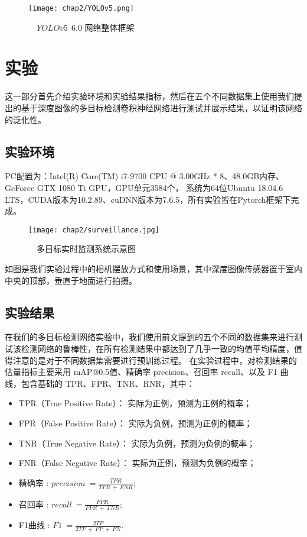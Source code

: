 \vspace{6mm}
\begin{figure}[h]
	\centering
	\texttt{[image: chap2/YOLOv5.png]}
	\caption{\ \ $YOLOv5\ \ 6.0$ 网络整体框架}
	\label{fig2-5}
\end{figure}
\vspace{3mm}

\section{实验}
\label{sec2-4}
这一部分首先介绍实验环境和实验结果指标，然后在五个不同数据集上使用我们提出的基于深度图像的多目标检测卷积神经网络进行测试并展示结果，以证明该网络的泛化性。

\subsection{实验环境}
PC配置为：Intel(R) Core(TM) i7-9700 CPU @ 3.00GHz * 8、48.0GB内存、GeForce GTX 1080 Ti GPU，GPU单元3584个，
系统为64位Ubuntu 18.04.6 LTS，CUDA版本为10.2.89、cuDNN版本为7.6.5，所有实验皆在Pytorch框架下完成。

\vspace{6mm}
\begin{figure}[h]
	\centering
	\texttt{[image: chap2/surveillance.jpg]}
	\caption{\ \ 多目标实时监测系统示意图}
	\label{fig2-6}
\end{figure}
\vspace{3mm}
如图是我们实验过程中的相机摆放方式和使用场景，其中深度图像传感器置于室内中央的顶部，垂直于地面进行拍摄。

\subsection{实验结果}
在我们的多目标检测网络实验中，我们使用前文提到的五个不同的数据集来进行测试该检测网络的鲁棒性，在所有检测结果中都达到了几乎一致的均值平均精度，值得注意的是对于不同数据集需要进行预训练过程。
在实验过程中，对检测结果的估量指标主要采用 mAP@0.5值、精确率 precision、召回率 recall、以及 F1 曲线，包含基础的 TPR、FPR、TNR、RNR，其中：

\begin{itemize}
	\item TPR（True Positive Rate）： 实际为正例，预测为正例的概率；

	\item FPR（False Positive Rate）： 实际为负例，预测为正例的概率；

	\item TNR（True Negative Rate）： 实际为负例，预测为负例的概率；
	
	\item FNR（False Negative Rate）： 实际为正例，预测为负例的概率；

	\item 精确率 : $ precision\ =\frac{TPR}{TPR\ +\ FNR} $;

	\item 召回率 : $ recall\ =\frac{FPR}{FPR\ +\ TNR} $;
	
	\item F1曲线 : $ F1\ =\frac{2TP}{2TP\ +\ FP\ +\ FN} $.
\end{itemize}

